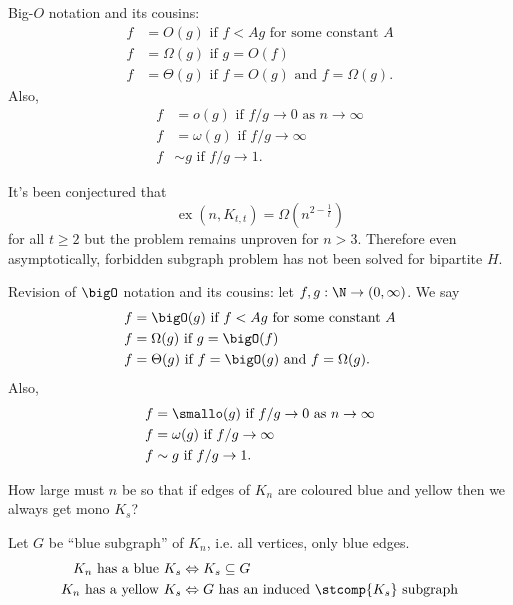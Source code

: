 \documentclass[a4paper]{article}
\newcommand*{\Omg}{\Omega}
\newcommand*{\bigT}{\Theta}
\newcommand*{\smallomg}{\omega}
\DeclareMathOperator{\exx}{ex} %
\begin{document}
\begin{notation}
  Big-\(O\) notation and its cousins:
\begin{align*}
  f &= O(g) \text{ if } f< Ag \text{ for some constant } A \\
  f &= \Omega(g) \text{ if } g=O(f) \\
  f &= \Theta(g) \text{ if } f= O(g) \text{ and } f = \Omega(g).
\end{align*}
Also,
\begin{align*}
  f &= o(g) \text{ if } f/g\to 0 \text{ as } n\to \infty \\
  f &= \omega(g) \text{ if } f/g\to \infty \\
  f &\sim g \text{ if } f/g\to 1.
\end{align*}
\end{notation}

It's been conjectured that
\[
  \exx(n, K_{t, t}) = \Omega(n^{2 - \frac{1}{t}})
\]
for all \(t \geq 2\) but the problem remains unproven for \(n > 3\). Therefore even asymptotically, forbidden subgraph problem has not been solved for bipartite \(H\).







\iffalse

Revision of \(\bigO\) notation and its cousins: let \(f,g:\N\to (0,\infty)\). We say
\begin{align*}
  f &= \bigO(g) \text{ if } f< Ag \text{ for some constant } A \\
  f &= \Omg(g) \text{ if } g=\bigO(f) \\
  f &= \bigT(g) \text{ if } f=\bigO(g) \text{ and } f = \Omg(g).
\end{align*}
Also,
\begin{align*}
  f &= \smallo(g) \text{ if } f/g\to 0 \text{ as } n\to \infty \\
  f &= \smallomg(g) \text{ if } f/g\to \infty \\
  f &\sim g \text{ if } f/g\to 1.
\end{align*}



\begin{question}
  How large must \(n\) be so that if edges of \(K_n\) are coloured blue and yellow then we always get mono \(K_s\)?
\end{question}

Let \(G\) be ``blue subgraph'' of \(K_n\), i.e. all vertices, only blue edges.
\begin{align*}
  K_n \text{ has a blue } K_s &\Leftrightarrow K_s \subseteq G \\
  K_n \text{ has a yellow } K_s &\Leftrightarrow G \text{ has an induced } \stcomp{K_s} \text{ subgraph}
\end{align*}
\end{document}
